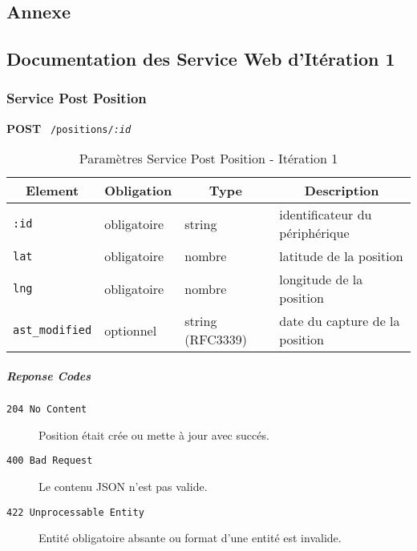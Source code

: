 \begin{appendices}
\section{Annexe}
\pagebreak

\subsection{Documentation des Service Web d'Itération 1}

\subsubsection{Service Post Position}
\label{appendix:sprint1-position-post-doc}

\textbf{POST} \ \texttt{/positions/\textit{:id}}

\begin{table}[htbp]
    \caption{Paramètres Service Post Position - Itération 1}
    \begin{tabular}{|l | l | l | l|}
        \hline
        \multicolumn{1}{|c|}{\textbf{Element}} &
        \multicolumn{1}{c|}{\textbf{Obligation}} &
        \multicolumn{1}{c|}{\textbf{Type}} &
        \multicolumn{1}{c|}{\textbf{Description}} \\ \hline
        \verb|:id| & obligatoire & string & identificateur du périphérique \\ \hline
        \verb|lat| & obligatoire & nombre & latitude de la position \\ \hline
        \verb|lng| & obligatoire & nombre & longitude de la position \\ \hline
        \verb|ast_modified| & optionnel & string (RFC3339) & date du capture de la position \\ \hline
    \end{tabular}
\end{table}

\subparagraph*{Reponse Codes}
\begin{description}
    \item[\texttt{204 No Content}] Position était crée ou mette à jour avec succés.
    \item[\texttt{400 Bad Request}] Le contenu JSON n'est pas valide.
    \item[\texttt{422 Unprocessable Entity}] Entité obligatoire absante ou format d'une entité est invalide.
\end{description}


\end{appendices}
